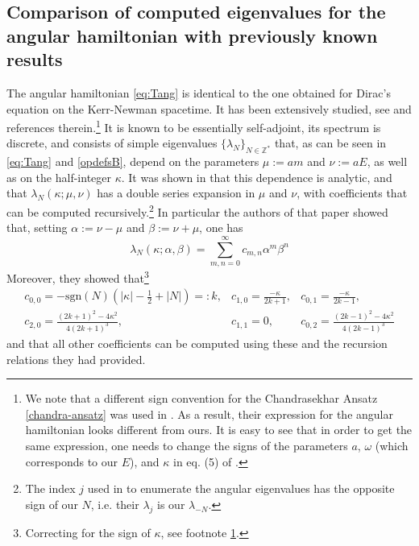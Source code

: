 \documentclass[11 pt]{article}
\renewcommand\({\left(}
\renewcommand\){\right)}
\newcommand\<{\langle}
\renewcommand\>{\rangle}
\newcommand\8{\infty}
\newcommand\beq{\begin{equation}}
\newcommand\eeq{\end{equation}}
\newcommand{\la} {\lambda}\newcommand{\La}{\Lambda}
\newcommand{\om}{\omega}
\newcommand{\half}{\frac{1}{2}}
\newcommand{\sgn}{\mbox{sgn}}
\begin{document}
\subsection{Comparison of computed eigenvalues for the angular hamiltonian with previously known results}
The angular hamiltonian \eqref{eq:Tang} is identical to the one obtained for Dirac's equation on the Kerr-Newman spacetime.  It has been extensively studied, see \cite{BSW} and references therein.\footnote{We note that a different sign convention for the Chandrasekhar Ansatz \eqref{chandra-ansatz} was used in \cite{BSW}.  As a result, their expression for the angular hamiltonian looks different from ours.  It is easy to see that in order to get the same expression, one needs to change the signs of the parameters $a$, $\om$ (which corresponds to our $E$), and $\kappa$ in eq. (5) of \cite{BSW}.\label{fn:bsw}} It is known to be essentially self-adjoint, its spectrum is discrete, and consists of simple eigenvalues $\{\lambda_N\}_{N\in \mathbb{Z}^*}$ that, {as can be seen in \eqref{eq:Tang} and \eqref{opdefsB},} depend on the parameters $\mu := am$ and $\nu := aE$, as well as on the half-integer $\kappa$.  
It was shown in \cite{BSW} that this dependence is analytic, and that $\la_N(\kappa; \mu,\nu)$ has a double series expansion in $\mu$ and $\nu$, with coefficients that can be computed recursively.\footnote{The index $j$ used in \cite{BSW} to enumerate the angular eigenvalues has the opposite sign of our $N$, i.e. their $\la_j$ is our $\la_{-N}$.}  In particular the authors of that paper
 showed that, setting $\alpha := \nu-\mu$ and $\beta := \nu+\mu$, one has
\beq\label{expansion}
\lambda_N(\kappa; \alpha, \beta) = \sum_{m,n=0}^\infty c_{m,n}\alpha^m\beta^n
\eeq
Moreover, they showed that\footnote{Correcting for the sign of $\kappa$, see footnote \ref{fn:bsw}.}
\beq\begin{array}{lll}
c_{0,0} = -\sgn(N)(|\kappa|-\half+|N|) =: k, &
c_{1,0} = \frac{-\kappa}{2k+1}, &  c_{0,1} = \frac{-\kappa}{2k-1}, \\[5pt]
c_{2,0} = \frac{(2k+1)^2 - 4\kappa^2}{4(2k+1)^3},&  c_{1,1} = 0, &
c_{0,2} = \frac{(2k-1)^2 - 4\kappa^2}{4(2k-1)^3}
\end{array}
\eeq
and that all other coefficients can be computed using these and the recursion relations they had provided.  
\end{document}
